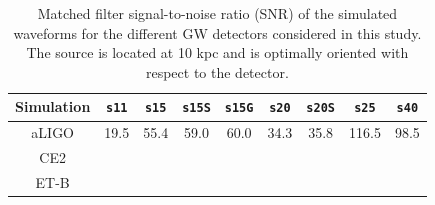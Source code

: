 \begin{table}
  \centering
  \begin{tabular}{c|cccccccc}
    \hline
    
    Simulation & \texttt{s11} & \texttt{s15} & \texttt{s15S} & \texttt{s15G} & \texttt{s20} & \texttt{s20S} & \texttt{s25}  & \texttt{s40}
    \\   
    \hline
    aLIGO      & 19.5         & 55.4         & 59.0          &   60.0        & 34.3         &   35.8          & 116.5         & 98.5
    \\ 
    \hline
    CE2
    \\
    \hline
    ET-B
    \\ 
  \end{tabular}
  \caption{%
    Matched filter signal-to-noise ratio (SNR) of the simulated waveforms for
    the different GW detectors considered in this study. The source is located
    at 10 kpc and is optimally oriented with respect to the detector.
  }
  \label{Tab:SNR}
\end{table}

